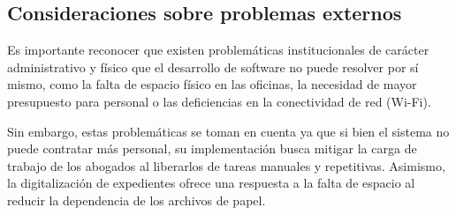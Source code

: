 \begin{flushleft}
\subsection{Consideraciones sobre problemas externos}

Es importante reconocer que existen problemáticas institucionales de carácter administrativo y físico que el desarrollo de software no puede resolver por sí mismo, como la falta de espacio físico en las oficinas, la necesidad de mayor presupuesto para personal o las deficiencias en la conectividad de red (Wi-Fi).

Sin embargo, estas problemáticas se toman en cuenta ya que si bien el sistema no puede contratar más personal, su implementación busca mitigar la carga de trabajo de los abogados al liberarlos de tareas manuales y repetitivas. Asimismo, la digitalización de expedientes ofrece una respuesta a la falta de espacio al reducir la dependencia de los archivos de papel.

\end{flushleft}